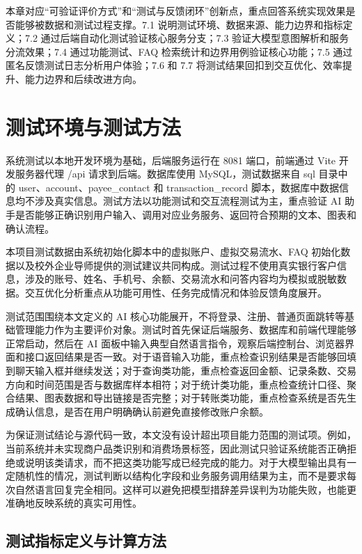 \documentclass[bachelor, print]{xduthesis}
\begin{document}
本章对应“可验证评价方式”和“测试与反馈闭环”创新点，重点回答系统实现效果是否能够被数据和测试过程支撑。7.1 说明测试环境、数据来源、能力边界和指标定义；7.2 通过后端自动化测试验证核心服务分支；7.3 验证大模型意图解析和服务分流效果；7.4 通过功能测试、FAQ 检索统计和边界用例验证核心功能；7.5 通过匿名反馈测试日志分析用户体验；7.6 和 7.7 将测试结果回扣到交互优化、效率提升、能力边界和后续改进方向。

\section{测试环境与测试方法}

系统测试以本地开发环境为基础，后端服务运行在 8081 端口，前端通过 Vite 开发服务器代理 /api 请求到后端。数据库使用 MySQL，测试数据来自 sql 目录中的 user、account、payee\_contact 和 transaction\_record 脚本，数据库中数据信息均不涉及真实信息。测试方法以功能测试和交互流程测试为主，重点验证 AI 助手是否能够正确识别用户输入、调用对应业务服务、返回符合预期的文本、图表和确认流程。

本项目测试数据由系统初始化脚本中的虚拟账户、虚拟交易流水、FAQ 初始化数据以及校外企业导师提供的测试建议共同构成。测试过程不使用真实银行客户信息，涉及的账号、姓名、手机号、余额、交易流水和问答内容均为模拟或脱敏数据。交互优化分析重点从功能可用性、任务完成情况和体验反馈角度展开。

测试范围围绕本文定义的 AI 核心功能展开，不将登录、注册、普通页面跳转等基础管理能力作为主要评价对象。测试时首先保证后端服务、数据库和前端代理能够正常启动，然后在 AI 面板中输入典型自然语言指令，观察后端控制台、浏览器界面和接口返回结果是否一致。对于语音输入功能，重点检查识别结果是否能够回填到聊天输入框并继续发送；对于查询类功能，重点检查返回金额、记录条数、交易方向和时间范围是否与数据库样本相符；对于统计类功能，重点检查统计口径、聚合结果、图表数据和导出链接是否完整；对于转账类功能，重点检查系统是否先生成确认信息，是否在用户明确确认前避免直接修改账户余额。

为保证测试结论与源代码一致，本文没有设计超出项目能力范围的测试项。例如，当前系统并未实现商户品类识别和消费场景标签，因此测试只验证系统能否正确拒绝或说明该类请求，而不把这类功能写成已经完成的能力。对于大模型输出具有一定随机性的情况，测试判断以结构化字段和业务服务调用结果为主，而不是要求每次自然语言回复完全相同。这样可以避免把模型措辞差异误判为功能失败，也能更准确地反映系统的真实可用性。

\subsection{测试指标定义与计算方法}
\end{document}
